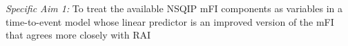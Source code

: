 \emph{Specific Aim 1:} To treat the available NSQIP mFI components as variables in a time-to-event model whose linear predictor is an improved version of the mFI that agrees more closely with RAI